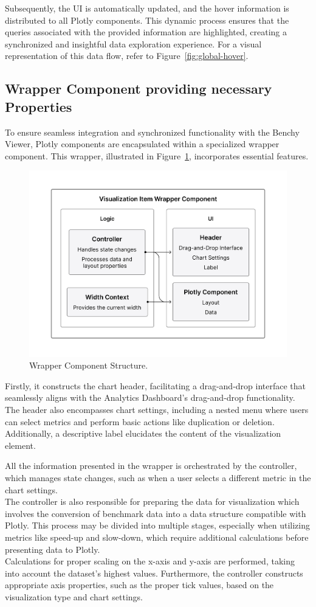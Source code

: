 Subsequently, the UI is automatically updated, and the hover information is distributed to all Plotly components. This dynamic process ensures that the queries associated with the provided information are highlighted, creating a synchronized and insightful data exploration experience. For a visual representation of this data flow, refer to Figure~\ref{fig:global-hover}.

\subsection{Wrapper Component providing necessary Properties}
To ensure seamless integration and synchronized functionality with the Benchy Viewer, Plotly components are encapsulated within a specialized wrapper component. This wrapper, illustrated in Figure~\ref{fig:chart-wrapper}, incorporates essential features.

\begin{figure}[h]
  \centering
  \includegraphics[width=0.6\linewidth]{figures/chart-wrapper.png}
  \caption{Wrapper Component Structure.}
  \label{fig:chart-wrapper}
\end{figure}

Firstly, it constructs the chart header, facilitating a drag-and-drop interface that seamlessly aligns with the Analytics Dashboard's drag-and-drop functionality. The header also encompasses chart settings, including a nested menu where users can select metrics and perform basic actions like duplication or deletion. Additionally, a descriptive label elucidates the content of the visualization element.

All the information presented in the wrapper is orchestrated by the controller, which manages state changes, such as when a user selects a different metric in the chart settings.\\
The controller is also responsible for preparing the data for visualization which involves the conversion of benchmark data into a data structure compatible with Plotly. This process may be divided into multiple stages, especially when utilizing metrics like speed-up and slow-down, which require additional calculations before presenting data to Plotly.\\
Calculations for proper scaling on the x-axis and y-axis are performed, taking into account the dataset's highest values. Furthermore, the controller constructs appropriate axis properties, such as the proper tick values, based on the visualization type and chart settings.

